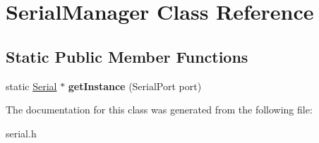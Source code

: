 \hypertarget{classSerialManager}{}\section{Serial\+Manager Class Reference}
\label{classSerialManager}
\subsection*{Static Public Member Functions}
\begin{DoxyCompactItemize}
\item 
\mbox{\label{classSerialManager_a6b9c81d22a14b2c3a072a4c2120e5ae7}} 
static \mbox{\hyperlink{classSerial}{Serial}} $\ast$ {\bfseries get\+Instance} (Serial\+Port port)
\end{DoxyCompactItemize}


The documentation for this class was generated from the following file\+:\begin{DoxyCompactItemize}
\item 
serial.\+h\end{DoxyCompactItemize}
